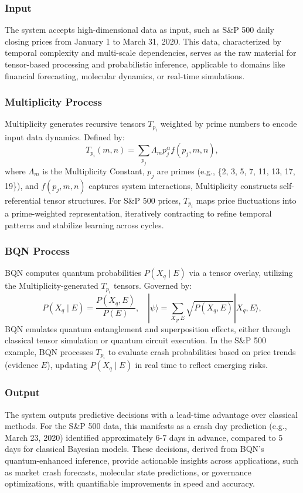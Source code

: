\documentclass[12pt]{article}
\begin{document}
\subsubsection{Input}
The system accepts high-dimensional data as input, such as S\&P 500 daily closing prices from January 1 to March 31, 2020. This data, characterized by temporal complexity and multi-scale dependencies, serves as the raw material for tensor-based processing and probabilistic inference, applicable to domains like financial forecasting, molecular dynamics, or real-time simulations.

\subsubsection{Multiplicity Process}
Multiplicity generates recursive tensors \( T_{p_i} \) weighted by prime numbers to encode input data dynamics. Defined by:
\begin{equation}
T_{p_i}(m, n) = \sum_{p_j} \Lambda_m p_j^\alpha f(p_j, m, n),
\end{equation}
where \( \Lambda_m \) is the Multiplicity Constant, \( p_j \) are primes (e.g., \{2, 3, 5, 7, 11, 13, 17, 19\}), and \( f(p_j, m, n) \) captures system interactions, Multiplicity constructs self-referential tensor structures. For S\&P 500 prices, \( T_{p_i} \) maps price fluctuations into a prime-weighted representation, iteratively contracting to refine temporal patterns and stabilize learning across cycles.

\subsubsection{BQN Process}
BQN computes quantum probabilities \( P(X_q \mid E) \) via a tensor overlay, utilizing the Multiplicity-generated \( T_{p_i} \) tensors. Governed by:
\begin{equation}
P(X_q \mid E) = \frac{P(X_q, E)}{P(E)}, \quad |\psi\rangle = \sum_{X_q, E} \sqrt{P(X_q, E)} |X_q, E\rangle,
\end{equation}
BQN emulates quantum entanglement and superposition effects, either through classical tensor simulation or quantum circuit execution. In the S\&P 500 example, BQN processes \( T_{p_i} \) to evaluate crash probabilities based on price trends (evidence \( E \)), updating \( P(X_q \mid E) \) in real time to reflect emerging risks.

\subsubsection{Output}
The system outputs predictive decisions with a lead-time advantage over classical methods. For the S\&P 500 data, this manifests as a crash day prediction (e.g., March 23, 2020) identified approximately 6-7 days in advance, compared to 5 days for classical Bayesian models. These decisions, derived from BQN’s quantum-enhanced inference, provide actionable insights across applications, such as market crash forecasts, molecular state predictions, or governance optimizations, with quantifiable improvements in speed and accuracy.
\end{document}
